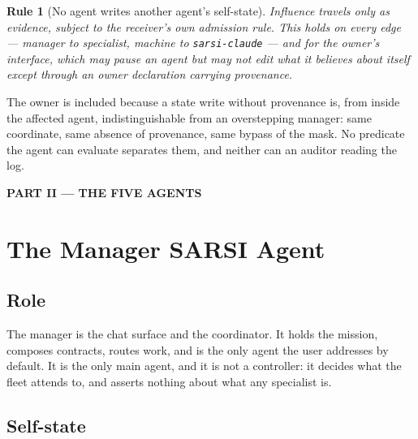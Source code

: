 \documentclass[11pt]{article}
\newtheorem{drule}{Rule}
\newcommand{\code}[1]{\texttt{\small #1}}
\begin{document}
\begin{drule}[No agent writes another agent's self-state]
\label{rule:nocrosswrite}
Influence travels only as evidence, subject to the receiver's own admission rule. This holds on every edge --- manager to specialist, machine to \code{sarsi-claude} --- and for the owner's interface, which may pause an agent but may not edit what it believes about itself except through an owner declaration carrying provenance.
\end{drule}

The owner is included because a state write without provenance is, from inside the affected agent, indistinguishable from an overstepping manager: same coordinate, same absence of provenance, same bypass of the mask. No predicate the agent can evaluate separates them, and neither can an auditor reading the log.

\newpage
\begin{center}\large\bfseries PART II --- THE FIVE AGENTS\end{center}

\section{The Manager SARSI Agent}
\label{sec:manager}

\subsection{Role}

The manager is the chat surface and the coordinator. It holds the mission, composes contracts, routes work, and is the only agent the user addresses by default. It is the only main agent, and it is not a controller: it decides what the fleet attends to, and asserts nothing about what any specialist is.

\subsection{Self-state}
\end{document}
